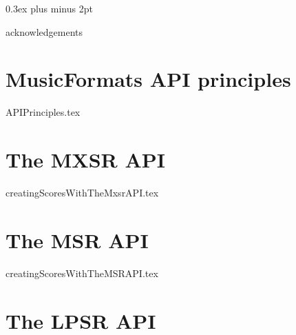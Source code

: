 \documentclass[11pt,a4paper]{report}
\begin{document}
{ %
  \setlength {\parskip} {0.3ex plus \baselineskip minus 2pt}

  \tableofcontents

  \listoffigures
}



\newpage

{acknowledgements}


\part{MusicFormats API principles}

{APIPrinciples.tex}


\part{The MXSR API}

{creatingScoresWithTheMxsrAPI.tex}


\part{The MSR API}

{creatingScoresWithTheMSRAPI.tex}


\part{The LPSR API}
\end{document}
